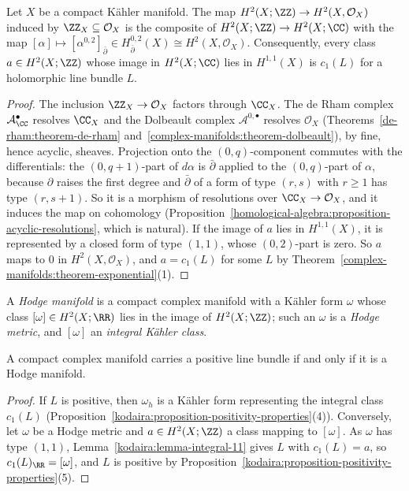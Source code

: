 \begin{lemma}\label{kodaira:lemma-integral-11}
Let $X$ be a compact K\"ahler manifold. The map $H^2(X; \ZZ) \to H^2(X, \mathcal{O}_X)$ induced by $\ZZ_X \subseteq \mathcal{O}_X$ is the
composite of $H^2(X; \ZZ) \to H^2(X; \CC)$ with the map $[\alpha] \mapsto [\alpha^{0,2}]_{\bar\partial} \in H^{0,2}_{\bar\partial}(X) \cong H^2(X, \mathcal{O}_X)$.
Consequently, every class $a \in H^2(X; \ZZ)$ whose image in $H^2(X; \CC)$ lies in $H^{1,1}(X)$ is $c_1(L)$ for a holomorphic line bundle $L$.
\end{lemma}

\begin{proof}
The inclusion $\ZZ_X \to \mathcal{O}_X$ factors through $\CC_X$. The de Rham complex $\mathcal{A}^\bullet_\CC$ resolves $\CC_X$ and the
Dolbeault complex $\mathcal{A}^{0,\bullet}$ resolves $\mathcal{O}_X$ (Theorems~\ref{de-rham:theorem-de-rham} and~\ref{complex-manifolds:theorem-dolbeault}),
by fine, hence acyclic, sheaves. Projection onto the $(0,q)$-component commutes with the differentials: the $(0, q+1)$-part of $d\alpha$ is
$\bar\partial$ applied to the $(0,q)$-part of $\alpha$, because $\partial$ raises the first degree and $\bar\partial$ of a form of type $(r, s)$
with $r \geq 1$ has type $(r, s+1)$. So it is a morphism of resolutions over $\CC_X \to \mathcal{O}_X$, and it induces the map on cohomology
(Proposition~\ref{homological-algebra:proposition-acyclic-resolutions}, which is natural). If the image of $a$ lies in $H^{1,1}(X)$, it is
represented by a closed form of type $(1,1)$, whose $(0,2)$-part is zero. So $a$ maps to $0$ in $H^2(X, \mathcal{O}_X)$, and $a = c_1(L)$ for
some $L$ by Theorem~\ref{complex-manifolds:theorem-exponential}(1).
\end{proof}

\begin{definition}\label{kodaira:definition-hodge-manifold}
A \emph{Hodge manifold} is a compact complex manifold with a K\"ahler form $\omega$ whose class $[\omega] \in H^2(X; \RR)$ lies in the image
of $H^2(X; \ZZ)$; such an $\omega$ is a \emph{Hodge metric}, and $[\omega]$ an \emph{integral K\"ahler class}.
\end{definition}

\begin{corollary}\label{kodaira:corollary-positive-iff-hodge}
A compact complex manifold carries a positive line bundle if and only if it is a Hodge manifold.
\end{corollary}

\begin{proof}
If $L$ is positive, then $\omega_h$ is a K\"ahler form representing the integral class $c_1(L)$
(Proposition~\ref{kodaira:proposition-positivity-properties}(4)). Conversely, let $\omega$ be a Hodge metric and $a \in H^2(X; \ZZ)$ a class
mapping to $[\omega]$. As $\omega$ has type $(1,1)$, Lemma~\ref{kodaira:lemma-integral-11} gives $L$ with $c_1(L) = a$, so $c_1(L)_\RR = [\omega]$,
and $L$ is positive by Proposition~\ref{kodaira:proposition-positivity-properties}(5).
\end{proof}

